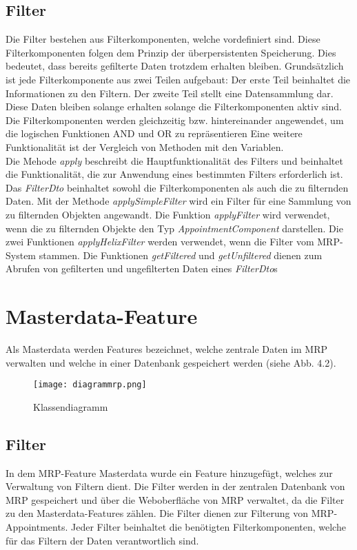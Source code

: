 \subsection{Filter}
Die Filter bestehen aus Filterkomponenten, welche vordefiniert sind. Diese Filterkomponenten folgen dem Prinzip der überpersistenten Speicherung. Dies bedeutet, dass bereits gefilterte Daten trotzdem erhalten bleiben. Grundsätzlich ist jede Filterkomponente aus zwei Teilen aufgebaut: Der erste Teil beinhaltet die Informationen zu den Filtern. Der zweite Teil stellt eine Datensammlung dar. Diese Daten bleiben solange erhalten solange die Filterkomponenten aktiv sind. Die Filterkomponenten werden gleichzeitig bzw. hintereinander angewendet, um die logischen Funktionen AND und OR zu repräsentieren Eine weitere Funktionalität ist der Vergleich von Methoden mit den Variablen.\\ Die Mehode \textit{apply} beschreibt die Hauptfunktionalität des Filters und beinhaltet die Funktionalität, die zur Anwendung eines bestimmten Filters erforderlich ist. Das \textit{FilterDto} beinhaltet sowohl die Filterkomponenten als auch die zu filternden Daten. Mit der Methode \textit{applySimpleFilter} wird ein Filter für eine Sammlung von zu filternden Objekten angewandt. Die Funktion \textit{applyFilter} wird verwendet, wenn die zu filternden Objekte den Typ \textit{AppointmentComponent} darstellen. Die zwei Funktionen \textit{applyHelixFilter} werden verwendet, wenn die Filter vom MRP-System stammen. Die Funktionen \textit{getFiltered} und \textit{getUnfiltered} dienen zum Abrufen von gefilterten und ungefilterten Daten eines \textit{FilterDto}s

\section{Masterdata-Feature}
Als Masterdata werden Features bezeichnet, welche zentrale Daten im MRP verwalten und welche in einer Datenbank gespeichert werden (siehe Abb. 4.2).
\begin{sidewaysfigure}
\texttt{[image: diagrammrp.png]}
\caption[]{Klassendiagramm}
\end{sidewaysfigure}

\subsection{Filter}
In dem MRP-Feature Masterdata wurde ein Feature hinzugefügt, welches zur Verwaltung von Filtern dient. Die Filter werden in der zentralen Datenbank von MRP gespeichert und über die Weboberfläche von MRP verwaltet, da die Filter zu den Masterdata-Features zählen. Die Filter dienen zur Filterung von MRP-Appointments. Jeder Filter beinhaltet die benötigten Filterkomponenten, welche für das Filtern der Daten verantwortlich sind. 
